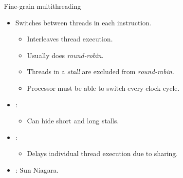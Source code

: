 \begin{frame}[t]{Fine-grain multithreading}
\begin{itemize}
  \item Switches between threads in each instruction.
    \begin{itemize}
      \item Interleaves thread execution.
      \item Usually does \emph{round-robin}.
      \item Threads in a \emph{stall} are excluded from \emph{round-robin}.
      \item Processor must be able to switch every clock cycle.
    \end{itemize}

  \item {}:
    \begin{itemize}
      \item Can hide short and long stalls.
    \end{itemize}

  \item {}:
    \begin{itemize}
      \item Delays individual thread execution due to sharing.
    \end{itemize}

  \item {}: Sun Niagara.
\end{itemize}
\end{frame}

